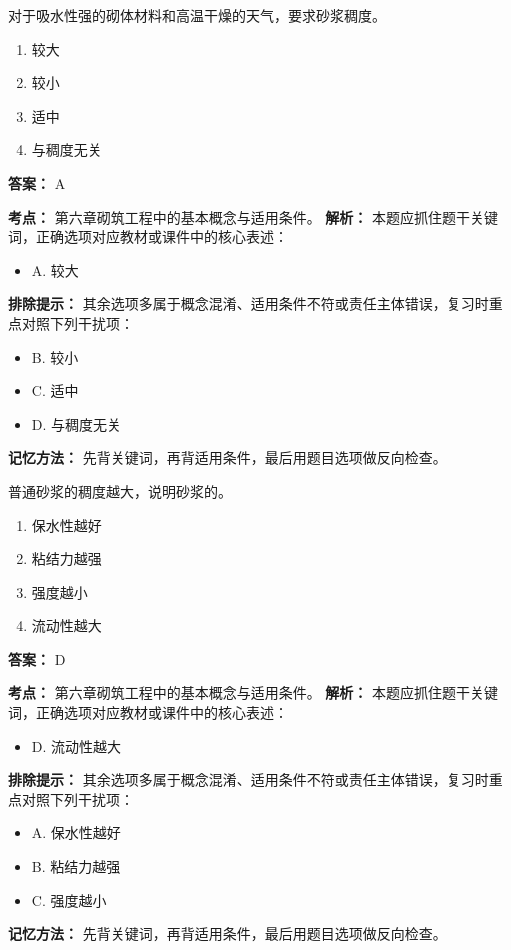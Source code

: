 \documentclass[UTF8,fontset=fandol,11pt]{ctexart}
\begin{document}
\begin{quizbox}[title={第 3 题}]
对于吸水性强的砌体材料和高温干燥的天气，要求砂浆稠度。\\
\begin{enumerate}[label=\Alph*.]
\item 较大
\item 较小
\item 适中
\item 与稠度无关
\end{enumerate}
\textbf{答案：} A
\vspace{0.25em}
\begin{answerbox}[title={考点解析}]
\textbf{考点：} 第六章砌筑工程中的基本概念与适用条件。
\textbf{解析：} 本题应抓住题干关键词，正确选项对应教材或课件中的核心表述：
\begin{itemize}
\item A. 较大
\end{itemize}
\textbf{排除提示：} 其余选项多属于概念混淆、适用条件不符或责任主体错误，复习时重点对照下列干扰项：
\begin{itemize}
\item B. 较小
\item C. 适中
\item D. 与稠度无关
\end{itemize}
\textbf{记忆方法：} 先背关键词，再背适用条件，最后用题目选项做反向检查。
\end{answerbox}
\end{quizbox}

\begin{quizbox}[title={第 4 题}]
普通砂浆的稠度越大，说明砂浆的。\\
\begin{enumerate}[label=\Alph*.]
\item 保水性越好
\item 粘结力越强
\item 强度越小
\item 流动性越大
\end{enumerate}
\textbf{答案：} D
\vspace{0.25em}
\begin{answerbox}[title={考点解析}]
\textbf{考点：} 第六章砌筑工程中的基本概念与适用条件。
\textbf{解析：} 本题应抓住题干关键词，正确选项对应教材或课件中的核心表述：
\begin{itemize}
\item D. 流动性越大
\end{itemize}
\textbf{排除提示：} 其余选项多属于概念混淆、适用条件不符或责任主体错误，复习时重点对照下列干扰项：
\begin{itemize}
\item A. 保水性越好
\item B. 粘结力越强
\item C. 强度越小
\end{itemize}
\textbf{记忆方法：} 先背关键词，再背适用条件，最后用题目选项做反向检查。
\end{answerbox}
\end{quizbox}
\end{document}
